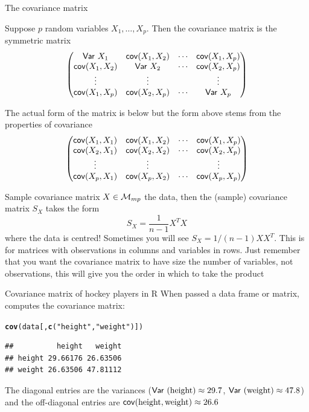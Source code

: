 \documentclass[aspectratio=169]{beamer}\usepackage[]{graphicx}\usepackage[]{xcolor}
\makeatletter
\newcommand{\hlsng}[1]{\textcolor[rgb]{0.192,0.494,0.8}{#1}}%
\newcommand{\hldef}[1]{\textcolor[rgb]{0.345,0.345,0.345}{#1}}%
\newcommand{\hlkwd}[1]{\textcolor[rgb]{0.737,0.353,0.396}{\textbf{#1}}}%
\newenvironment{kframe}{%
 \def\at@end@of@kframe{}%
 \ifinner\ifhmode%
  \def\at@end@of@kframe{\end{minipage}}%
  \begin{minipage}{\columnwidth}%
 \fi\fi%
 \def\FrameCommand##1{\hskip\@totalleftmargin \hskip-\fboxsep
 \colorbox{shadecolor}{##1}\hskip-\fboxsep
     \hskip-\linewidth \hskip-\@totalleftmargin \hskip\columnwidth}%
 \MakeFramed {\advance\hsize-\width
   \@totalleftmargin\z@ \linewidth\hsize
   \@setminipage}}%
 {\par\unskip\endMakeFramed%
 \at@end@of@kframe}
\newenvironment{knitrout}{}{} %
\makeatother
\begin{document}
\begin{frame}{The covariance matrix}
\begin{definition}
Suppose $p$ random variables $X_1,\ldots,X_p$. Then the covariance matrix is the symmetric matrix
\[
\begin{pmatrix}
\mathsf{Var}\  X_1 & \mathsf{cov}(X_1,X_2) & \cdots & \mathsf{cov}(X_1,X_p) \\
\mathsf{cov}(X_1,X_2) & \mathsf{Var}\  X_2 & \cdots & \mathsf{cov}(X_2,X_p) \\
\vdots & \vdots & & \vdots \\
\mathsf{cov}(X_1,X_p) & \mathsf{cov}(X_2,X_p) & \cdots & \mathsf{Var}\  X_p 
\end{pmatrix}
\]
\end{definition}
\vfill
The actual form of the matrix is below but the form above stems from the properties of covariance
\[
\begin{pmatrix}
\mathsf{cov}(X_1,X_1) & \mathsf{cov}(X_1,X_2) & \cdots & \mathsf{cov}(X_1,X_p) \\
\mathsf{cov}(X_2,X_1) & \mathsf{cov}(X_2,X_2) & \cdots & \mathsf{cov}(X_2,X_p) \\
\vdots & \vdots & & \vdots \\
\mathsf{cov}(X_p,X_1) & \mathsf{cov}(X_p,X_2) & \cdots & \mathsf{cov}(X_p,X_p) 
\end{pmatrix}
\]
\end{frame}

\begin{frame}{Sample covariance matrix}
$X\in\mathcal{M}_{mp}$ the data, then the (sample) covariance matrix $S_X$ takes the form
\[
S_X = \frac{1}{n-1}X^TX
\]
where the data is centred!
\vfill
Sometimes you will see $S_X=1/(n-1)XX^T$. This is for matrices with observations in columns and variables in rows. Just remember that you want the covariance matrix to have size the number of variables, not observations, this will give you the order in which to take the product
\end{frame}

\begin{frame}[fragile]{Covariance matrix of hockey players in R}
When passed a data frame or matrix,  computes the covariance matrix:
\vfill
\begin{knitrout}
\color{fgcolor}\begin{kframe}
\begin{alltt}
\hlkwd{cov}\hldef{(data[,} \hlkwd{c}\hldef{(}\hlsng{"height"}\hldef{,} \hlsng{"weight"}\hldef{)])}
\end{alltt}
\begin{verbatim}
##          height   weight
## height 29.66176 26.63506
## weight 26.63506 47.81112
\end{verbatim}
\end{kframe}
\end{knitrout}
\vfill
The diagonal entries are the variances ($\mathsf{Var}\ (\text{height})\approx 29.7$, $\mathsf{Var}\ (\text{weight})\approx 47.8$) and the off-diagonal entries are $\mathsf{cov}(\text{height}, \text{weight})\approx 26.6$
\end{frame}
\end{document}
